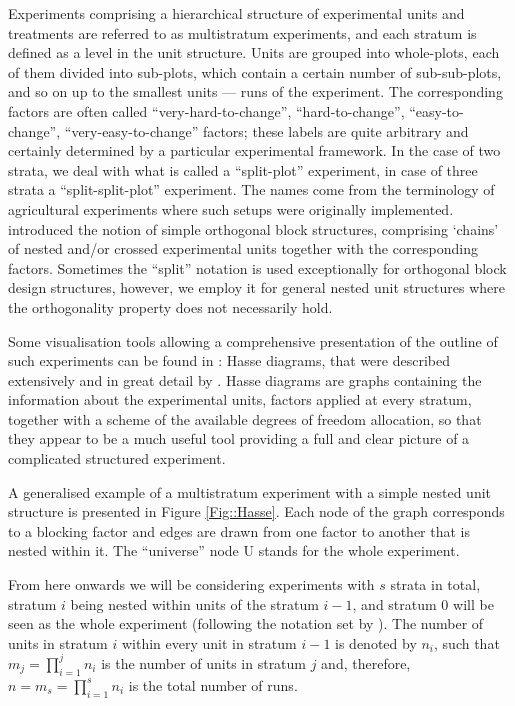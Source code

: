 Experiments comprising a hierarchical structure of experimental units and treatments are referred to as multistratum experiments, and each stratum is defined as a level in the unit structure. Units are grouped into whole-plots, each of them divided into sub-plots, which contain a certain number of sub-sub-plots, and so on up to the smallest units --- runs of the experiment. The corresponding factors are often called ``very-hard-to-change'', ``hard-to-change'', ``easy-to-change'', ``very-easy-to-change'' factors; these labels are quite arbitrary and certainly determined by a particular experimental framework. In the case of two strata, we deal with what is called a ``split-plot'' experiment, in case of three strata a ``split-split-plot'' experiment. The names come from the terminology of agricultural experiments where such setups were originally implemented. \cite{Nelder1965analysis} introduced the notion of simple orthogonal block structures, comprising `chains' of nested and/or crossed experimental units together with the corresponding factors. Sometimes the ``split'' notation is used exceptionally for orthogonal block design structures, however, we employ it for general nested unit structures where the orthogonality property does not necessarily hold.

Some visualisation tools allowing a comprehensive presentation of the outline of such experiments can be found in \cite{Goos2012Hasse}: Hasse diagrams, that were described extensively and in great detail by \cite{Bailey2008design}. Hasse diagrams are graphs containing the information about the experimental units, factors applied at every stratum, together with a scheme of the available degrees of freedom allocation, so that they appear to be a much useful tool providing a full and clear picture of a complicated structured experiment. 

A generalised example of a multistratum experiment with a simple nested unit structure is presented in Figure \ref{Fig::Hasse}. Each node of the graph corresponds to a blocking factor and edges are drawn from one factor to another that is nested within it. The ``universe'' node U stands for the whole experiment.

From here onwards we will be considering experiments with $s$ strata in total, stratum $i$ being nested within units of the stratum $i-1$, and stratum $0$ will be seen as the whole experiment (following the notation set by \citet{Trinca2015improved}). The number of units in stratum $i$ within every unit in stratum $i-1$ is denoted by $n_i$, such that $m_{j}=\prod_{i=1}^{j}n_{i}$ is the number of units in stratum $j$ and, therefore,  $n=m_{s}=\prod_{i=1}^{s}n_{i}$ is the total number of runs.

